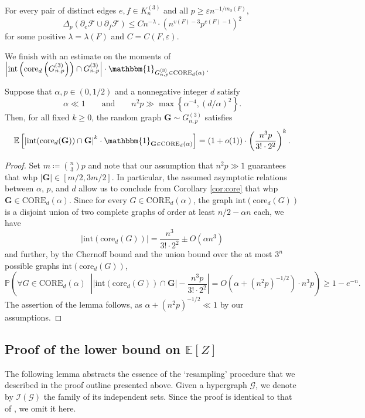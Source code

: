 \documentclass[11pt,a4paper,oneside,reqno]{amsart}
\newcommand{\Gnp}{G_{n, p}^{(3)}}
\newcommand{\bG}{\mathbf{G}}
\newcommand{\cF}{\mathcal{F}}
\newcommand{\cG}{\mathcal{G}}
\newcommand{\cI}{\mathcal{I}}
\renewcommand{\Pr}{\mathbb{P}}
\newcommand{\Ex}{\mathbb{E}}
\newcommand{\1}{\mathbbm{1}} %
\newcommand{\eps}{\varepsilon}
\renewcommand{\le}{\leqslant}
\renewcommand{\ge}{\geqslant}
\renewcommand{\int}{\mathrm{int}}
\newcommand{\core}{\mathrm{core}}
\newcommand{\Core}{\mathrm{CORE}}
\begin{document}
\begin{lemma}
  \label{lemma:Delta-p-partial-H}
  For every pair of distinct edges $e, f \in K_n^{(3)}$ and all $p \ge \eps n^{-1/m_3(F)}$,
  \[
    \Delta_p(\partial_e\cF \cup \partial_f \cF) \le Cn^{-\lambda} \cdot \left(n^{v(F)-3} p^{e(F)-1}\right)^2
  \]
  for some positive $\lambda = \lambda(F)$ and $C = C(F,\eps)$.
\end{lemma}
We finish with an estimate on the moments of $\left|\int\left(\core_d\left(\Gnp\right)\right) \cap \Gnp\right| \cdot \1_{\Gnp \in \Core_d(\alpha)}$.
\begin{lemma}
  \label{lemma:edges-int-core}
  Suppose that $\alpha, p \in (0,1/2)$ and a nonnegative integer $d$ satisfy
  \[
    \alpha \ll 1
    \qquad
    \text{and}
    \qquad
    n^2 p \gg \max\left\{\alpha^{-4}, (d/\alpha)^2\right\}.
  \]
  Then, for all fixed $k \ge 0$, the random graph $\bG \sim \Gnp$ satisfies
  \[
    \Ex\left[\left|\int(\core_d(\bG)) \cap \bG\right|^k \cdot \1_{\bG \in \Core_d(\alpha)}\right] = (1+o(1)) \cdot \left(\frac{n^3p}{3! \cdot 2^2}\right)^k.
  \]
\end{lemma}
\begin{proof}
  Set $m \coloneqq \binom{n}{3}p$ and note that our assumption that $n^2 p \gg 1$ guarantees that whp $|\bG| \in [m/2, 3m/2]$.
  In particular, the assumed asymptotic relations between $\alpha$, $p$, and $d$ allow us to conclude from Corollary \ref{cor:core} that whp $\bG \in \Core_d(\alpha)$.  Since for every $G \in \Core_d(\alpha)$, the graph $\int(\core_d(G))$ is a disjoint union of two complete graphs of order at least $n/2 - \alpha n$ each, we have
  \[
    \left|\int(\core_{d}(G))\right| = \frac{n^3}{3! \cdot 2^2} \pm O(\alpha n^3)
  \]
  and further, by the Chernoff bound and the union bound over the at most $3^n$ possible graphs $\int(\core_{d}(G))$,
  \[
    \Pr\left(\forall G \in \Core_d(\alpha) \;\; \left||\int(\core_{d}(G)) \cap \bG| - \frac{n^3 p}{3! \cdot 2^2}\right| = O\left(\alpha + (n^2p)^{-1/2}\right) \cdot n^3 p \right) \ge 1 - e^{-n}.
  \]
  The assertion of the lemma follows, as $\alpha + (n^2p)^{-1/2} \ll 1$ by our assumptions.
\end{proof}

\subsection{Proof of the lower bound on $\Ex[Z]$}
\label{sec:proof-lower-bound-Z}

The following lemma abstracts the essence of the `resampling' procedure that we described in the proof outline presented above.  Given a hypergraph $\cG$, we denote by $\cI(\cG)$ the family of its independent sets. Since the proof is identical to that of \cite[Lemma 4.6]{hoshen2024stabilitylargecutsrandom}, we omit it here.
\end{document}
